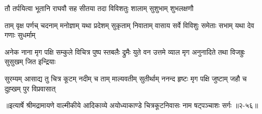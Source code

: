 \twolineshloka
{तौ तर्पयित्वा भूतानि राघवौ सह सीतया}
{तदा विविशतुः शालाम् सुशुभाम् शुभलक्षणौ} %

\fourlineindentedshloka
{ताम् वृक्ष पर्णच् चदनाम् मनोज्ञाम्}
{यथा प्रदेशम् सुकृताम् निवाताम्}
{वासाय सर्वे विविशुः समेताः}
{सभाम् यथा देव गणाः सुधर्माम्} %

\fourlineindentedshloka
{अनेक नाना मृग पक्षि सम्कुले}
{विचित्र पुष्प स्तबलैः द्रुमैः युते}
{वन उत्तमे व्याल मृग अनुनादिते}
{तथा विजह्रुः सुसुखम् जित इन्द्रियाः} %

\fourlineindentedshloka
{सुरम्यम् आसाद्य तु चित्र कूटम्}
{नदीम् च ताम् माल्यवतीम् सुतीर्थाम्}
{ननन्द हृष्टः मृग पक्षि जुष्टाम्}
{जहौ च दुह्खम् पुर विप्रवासात्} %


॥इत्यार्षे श्रीमद्रामायणे वाल्मीकीये आदिकाव्ये अयोध्याकाण्डे चित्रकूटनिवासः नाम षट्पञ्चाशः सर्गः ॥२-५६॥

